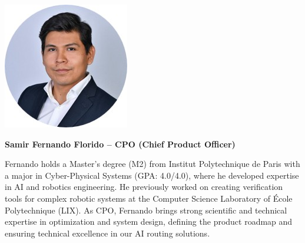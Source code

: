 \documentclass[english]{article}
\begin{document}
\vspace{1.5em}

\noindent
\begin{minipage}[c]{0.2\textwidth}
    \centering
    \includegraphics[width=0.9\linewidth]{images/fernando.jpg}
\end{minipage}%
\hfill
\begin{minipage}[c]{0.75\textwidth}
    \textbf{\large Samir Fernando Florido – CPO (Chief Product Officer)}
    \vspace{0.3em}

    \noindent Fernando holds a Master's degree (M2) from Institut Polytechnique de Paris with a major in Cyber-Physical Systems (GPA: 4.0/4.0), where he developed expertise in AI and robotics engineering.
    He previously worked on creating verification tools for complex robotic systems at the Computer Science Laboratory of École Polytechnique (LIX).
    As CPO, Fernando brings strong scientific and technical expertise in optimization and system design, defining the product roadmap and ensuring technical excellence in our AI routing solutions.
\end{minipage}

\vspace{1.5em}
\end{document}
